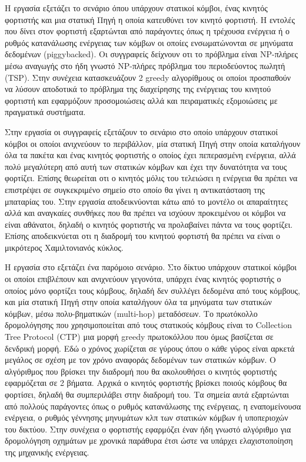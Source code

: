 Η εργασία \cite{prolonging_j-roc} εξετάζει το σενάριο όπου υπάρχουν στατικοί κόμβοι, ένας κινητός φορτιστής και μια στατική Πηγή η οποία κατευθύνει τον κινητό
φορτιστή. Η εντολές που δίνει στον φορτιστή εξαρτώνται από παράγοντες όπως η τρέχουσα ενέργεια ή ο ρυθμός κατανάλωσης ενέργειας των κόμβων οι οποίες ενσωματώνονται σε
μηνύματα δεδομένων (piggybacked). Οι συγγραφείς δείχνουν οτι το πρόβλημα είναι NP-πλήρες μέσω αναγωγής στο ήδη γνωστό NP-πλήρες πρόβλημα του περιοδεύοντος πωλητή
(TSP). Στην συνέχεια κατασκευάζουν 2 greedy αλγορίθμους οι οποίοι προσπαθούν να λύσουν αποδοτικά το πρόβλημα της διαχείρησης της ενέργειας του κινητού φορτιστή και
εφαρμόζουν προσομοιώσεις αλλά και πειραματικές εξομοιώσεις με πραγματικά συστήματα.

Στην εργασία \cite{immortal_wsns} οι συγγραφείς εξετάζουν το σενάριο στο οποίο υπάρχουν στατικοί κόμβοι οι οποίοι ανιχνεύουν το περιβάλλον, μία στατική Πηγή στην
οποία καταλήγουν όλα τα πακέτα και ένας κινητός φορτιστής ο οποίος έχει πεπερασμένη ενέργεια, αλλά πολύ μεγαλύτερη από αυτή των στατικών κόμβων και έχει την
δυνατότητα να τους φορτίζει. Επίσης θεωρείται οτι ο κινητός μόλις του τελειώσει η ενέργεια θα πρέπει να επιστρέψει σε συγκεκριμένο σημείο στο οποίο θα γίνει η
αντικατάσταση της μπαταρίας του. Στην εργασία αποδεικνύονται κάτω από το μοντέλο οι απαραίτητες αλλά και αναγκαίες συνθήκες που θα πρέπει να ισχύουν προκειμένου οι
κόμβοι να είναι αθάνατοι, δηλαδή ο κινητός φορτιστής να προλαβαίνει πάντα να τους φορτίζει. Επίσης αποδεικνύεται οτι η διαδρομή του κινητού φορτιστή θα πρέπει να
είναι ο μικρότερος Χαμιλτονιανός κύκλος.

Η εργασία στο \cite{j-roc} εξετάζει ένα παρόμοιο σενάριο. Στο δίκτυο υπάρχουν στατικοί κόμβοι οι οποίοι επιβλέπουν και ανιχνεύουν γεγονότα, υπάρχει ένας κινητός
φορτιστής ο οποίος μόνο φορτίζει τους κόμβους, δηλαδή δεν συλλέγει δεδομένα από τους κόμβους, και μία στατική Πηγή στην οποία καταλήγουν όλα τα μηνύματα των στατικών
κόμβων, μέσω πολυ-βηματικών (multi-hop) μεταδόσεων. Το πρωτόκολλο δρομολόγησης που χρησιμοποιείται από τους στατικούς κόμβους είναι το Collection Tree Protocol (CTP)
μια μορφή greedy πρωτοκόλλου που όμως βασίζεται σε δενδρική μορφή. Εδώ ο χρόνος χωρίζεται σε γύρους όπου ο κάθε γύρος είναι αρκετά μεγάλος σε σχέση με τον χρόνο
αναφοράς δεδομένων των στατικών κόμβων. Ο αλγόριθμος που βρίσκει την διαδρομή που θα ακολουθήσει ο κινητός φορτιστής εφαρμόζεται σε 2 βήματα. Αρχικά ο κινητός
φορτιστής βρίσκει ποιούς κόμβους θα φορτίσει, δηλαδή θα συμπεριλάβει στην διαδρομή του. Τα σημεία αυτά εξαρτώνται από πολλούς
παράγοντες όπως ο ρυθμός κατανάλωσης της ενέργειας, η εναπομείνουσα ενέργεια, ο ρυθμός γέννησης μηνυμάτων κλπ των στατικών κόμβων ή υποπεριοχών του δικτύου. Στην
συνέχεια ο φορτιστής εφαρμόζει έναν ήδη γνωστό αλγόριθμο \cite{VRPTW_solver} για δρομολόγηση οχημάτων με χρονικά παράθυρα έτσι ώστε να υπάρχει ελαχιστοποίηση της
μηχανικής ενέργειας.

